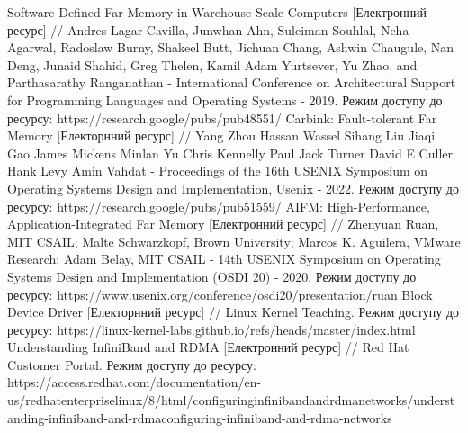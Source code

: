 \documentclass[14pt]{article}
\begin{document}
Software-Defined Far Memory in Warehouse-Scale Computers [Електронний ресурс] // Andres Lagar-Cavilla, Junwhan Ahn, Suleiman Souhlal, Neha Agarwal, Radoslaw Burny, Shakeel Butt, Jichuan Chang, Ashwin Chaugule, Nan Deng, Junaid Shahid, Greg Thelen, Kamil Adam Yurtsever, Yu Zhao, and Parthasarathy Ranganathan - International Conference on Architectural Support for Programming Languages and Operating Systems - 2019. Режим доступу до ресурсу: https://research.google/pubs/pub48551/
Carbink: Fault-tolerant Far Memory [Електорнний ресурс] // Yang Zhou Hassan Wassel Sihang Liu Jiaqi Gao James Mickens Minlan Yu Chris Kennelly Paul Jack Turner David E Culler Hank Levy Amin Vahdat - Proceedings of the 16th USENIX Symposium on Operating Systems Design and Implementation, Usenix - 2022. Режим доступу до ресурсу: https://research.google/pubs/pub51559/
AIFM: High-Performance, Application-Integrated Far Memory [Електронний ресурс] // Zhenyuan Ruan, MIT CSAIL; Malte Schwarzkopf, Brown University; Marcos K. Aguilera, VMware Research; Adam Belay, MIT CSAIL - 14th USENIX Symposium on Operating Systems Design and Implementation (OSDI 20) - 2020. Режим доступу до ресурсу: https://www.usenix.org/conference/osdi20/presentation/ruan
Block Device Driver [Електорнний ресурс] // Linux Kernel Teaching. Режим доступу до ресурсу: https://linux-kernel-labs.github.io/refs/heads/master/index.html
Understanding InfiniBand and RDMA [Електронний ресурс] // Red Hat Customer Portal. Режим доступу до ресурсу: https://access.redhat.com/documentation/en-us/red\textunderscore hat\textunderscore enterprise\textunderscore linux/8/html/configuring\textunderscore infiniband\textunderscore and\textunderscore rdma\textunderscore networks/understanding-infiniband-and-rdma\textunderscore configuring-infiniband-and-rdma-networks
\end{document}
